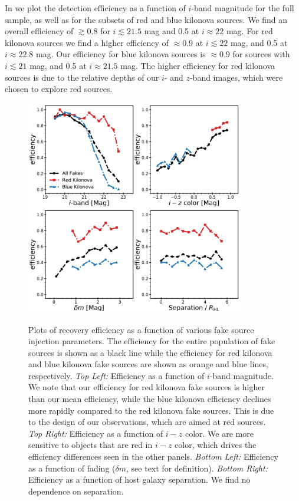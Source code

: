 In  we plot the detection efficiency as a function of $i$-band magnitude for the full sample, as well as for the subsets of red and blue kilonova sources. We find an overall efficiency of $\gtrsim0.8$ for $i \lesssim 21.5$ mag and 0.5 at $i \approx 22$ mag. For red kilonova sources we find a higher efficiency of $\approx 0.9$ at $i\lesssim 22$ mag, and 0.5 at $i\approx 22.8$ mag. Our efficiency for blue kilonova sources is $\approx 0.9$ for sources with $i\lesssim 21$ mag, and 0.5 at $i\approx 21.5$ mag. The higher efficiency for red kilonova sources is due to the relative depths of our $i$- and $z$-band images, which were chosen to explore red sources.

\begin{figure}[!t]
\begin{center}
\hspace*{-0.1in}
\scalebox{1.}
{\includegraphics[width=0.85\textwidth]{./figs/chapter3/f6.pdf}}
\caption{\singlespace Plots of recovery efficiency as a function of various fake source injection parameters. The efficiency for the entire population of fake sources is shown as a black line while the efficiency for red kilonova and blue kilonova fake sources are shown as orange and blue lines, respectively. {\it Top Left:} Efficiency as a function of $i$-band magnitude. We note that our efficiency for red kilonova fake sources is higher than our mean efficiency, while the blue kilonova efficiency declines more rapidly compared to the red kilonova fake sources. This is due to the design of our observations, which are aimed at red sources. {\it Top Right:} Efficiency as a function of $i-z$ color. We are more sensitive to objects that are red in $i-z$ color, which drives the efficiency differences seen in the other panels. {\it Bottom Left:} Efficiency as a function of fading ($\delta m$, see text for definition). {\it Bottom Right:} Efficiency as a function of host galaxy separation. We find no dependence on separation.}
\label{fig:ch3_eff_1D}
\end{center}
\end{figure}

